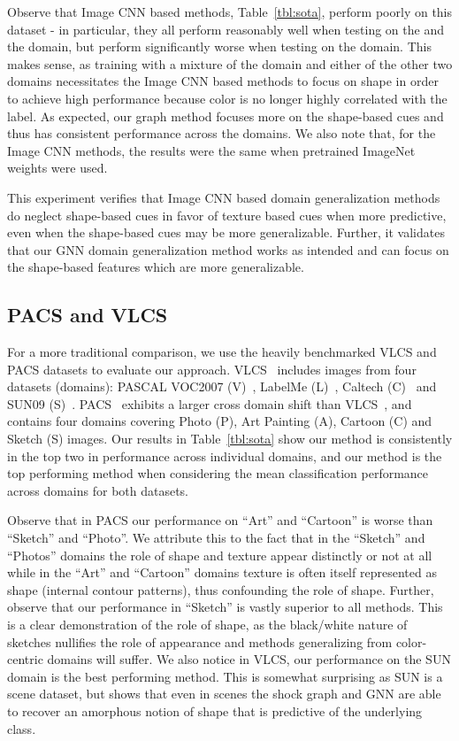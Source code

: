 Observe that Image CNN based methods, Table~\ref{tbl:sota},  perform poorly on this dataset - in particular, they all perform reasonably
well when testing on the  and the  domain, but perform
significantly worse when testing on the  domain. This makes sense, as
training with a mixture of the  domain and either of the other two
domains necessitates the Image CNN based methods to focus on shape in order to achieve high performance  because color
is no longer highly correlated with the label. As expected, our graph
method focuses more on the shape-based cues and thus has consistent performance
across the domains. We also note that, for the Image CNN methods, the results were the same when pretrained ImageNet weights were used.  




This experiment verifies that Image CNN based domain generalization methods do
neglect shape-based cues in favor of texture based cues when more predictive,
even when the shape-based cues may be more generalizable. Further, it validates
that our GNN domain generalization method works as intended and can focus on the
shape-based features which are more generalizable. 



\subsection{PACS and VLCS} 

For a more traditional comparison, we use the heavily benchmarked VLCS and PACS datasets to evaluate our approach. VLCS~\cite{Fang:etal:ICCV13} includes images from four datasets (domains): PASCAL VOC2007 (V)~\cite{Everingham:etal:IJCV15}, LabelMe (L)~\cite{Russell:etal:IJCV08}, Caltech (C)~\cite{Fei-Fei:Fergus:Perona:CVPRW04} and SUN09 (S)~\cite{Choi:etal:CVPR10}. PACS~\cite{Li:etal:ICCV17} exhibits a larger cross domain shift than VLCS~\cite{Fang:etal:ICCV13}, and contains four domains covering Photo (P), Art Painting (A), Cartoon (C) and Sketch (S) images. Our results in Table~\ref{tbl:sota} show our method is consistently in the top two in performance across individual domains,  and our method is the top performing method when considering the mean classification performance across domains for both datasets. 

Observe that in PACS our performance on ``Art'' and ``Cartoon'' is worse than ``Sketch'' and ``Photo''. We attribute this to the fact that in the ``Sketch'' and ``Photos'' domains the role of shape and texture appear distinctly or not at all while in the ``Art'' and ``Cartoon'' domains texture is often itself represented as shape (internal contour patterns), thus confounding the role of shape. Further, observe that our performance in ``Sketch'' is vastly superior to all methods. This is a clear demonstration of the role of shape, as the black/white nature of sketches nullifies the role of appearance and methods generalizing from color-centric domains will suffer. We also notice in VLCS,  our performance on the SUN domain is the best performing method. This is somewhat surprising as SUN is a scene dataset, but shows that even in scenes the shock graph and GNN are able to recover an amorphous notion of shape that is predictive of the underlying class. 


